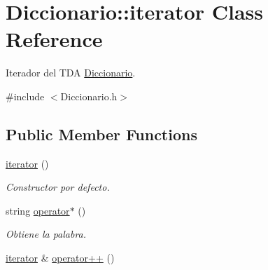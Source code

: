 \hypertarget{classDiccionario_1_1iterator}{\section{Diccionario\-:\-:iterator Class Reference}
\label{classDiccionario_1_1iterator}
}


Iterador del T\-D\-A \hyperlink{classDiccionario}{Diccionario}.  




{\ttfamily \#include $<$Diccionario.\-h$>$}

\subsection*{Public Member Functions}
\begin{DoxyCompactItemize}
\item 
\hypertarget{classDiccionario_1_1iterator_a09b6773eef10e4563efa069d3d88f4fc}{\hyperlink{classDiccionario_1_1iterator_a09b6773eef10e4563efa069d3d88f4fc}{iterator} ()}\label{classDiccionario_1_1iterator_a09b6773eef10e4563efa069d3d88f4fc}

\begin{DoxyCompactList}\small\item\em Constructor por defecto. \end{DoxyCompactList}\item 
\hypertarget{classDiccionario_1_1iterator_aa03a8aa59bb2b36d4b6d6540afc18deb}{string \hyperlink{classDiccionario_1_1iterator_aa03a8aa59bb2b36d4b6d6540afc18deb}{operator$\ast$} ()}\label{classDiccionario_1_1iterator_aa03a8aa59bb2b36d4b6d6540afc18deb}

\begin{DoxyCompactList}\small\item\em Obtiene la palabra. \end{DoxyCompactList}\item 
\hypertarget{classDiccionario_1_1iterator_a94988ab91331a66258a208276730bb9c}{\hyperlink{classDiccionario_1_1iterator}{iterator} \& \hyperlink{classDiccionario_1_1iterator_a94988ab91331a66258a208276730bb9c}{operator++} ()}\label{classDiccionario_1_1iterator_a94988ab91331a66258a208276730bb9c}


\end{DoxyCompactItemize}
